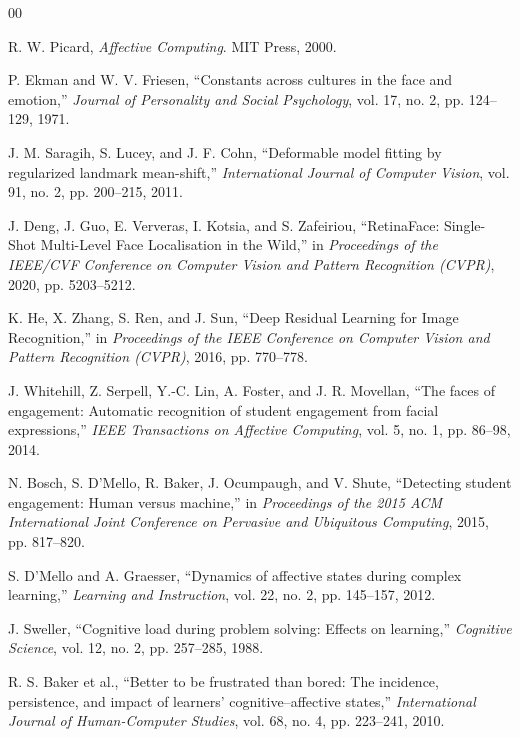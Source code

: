 \documentclass[conference]{IEEEtran}
\begin{document}
\begin{thebibliography}{00}

 R. W. Picard, \textit{Affective Computing}. MIT Press, 2000.

 P. Ekman and W. V. Friesen, ``Constants across cultures in the face and emotion,'' \textit{Journal of Personality and Social Psychology}, vol. 17, no. 2, pp. 124--129, 1971.

 J. M. Saragih, S. Lucey, and J. F. Cohn, ``Deformable model fitting by regularized landmark mean-shift,'' \textit{International Journal of Computer Vision}, vol. 91, no. 2, pp. 200--215, 2011.

 J. Deng, J. Guo, E. Ververas, I. Kotsia, and S. Zafeiriou, ``RetinaFace: Single-Shot Multi-Level Face Localisation in the Wild,'' in \textit{Proceedings of the IEEE/CVF Conference on Computer Vision and Pattern Recognition (CVPR)}, 2020, pp. 5203--5212.

 K. He, X. Zhang, S. Ren, and J. Sun, ``Deep Residual Learning for Image Recognition,'' in \textit{Proceedings of the IEEE Conference on Computer Vision and Pattern Recognition (CVPR)}, 2016, pp. 770--778.

 J. Whitehill, Z. Serpell, Y.-C. Lin, A. Foster, and J. R. Movellan, ``The faces of engagement: Automatic recognition of student engagement from facial expressions,'' \textit{IEEE Transactions on Affective Computing}, vol. 5, no. 1, pp. 86--98, 2014.

 N. Bosch, S. D'Mello, R. Baker, J. Ocumpaugh, and V. Shute, ``Detecting student engagement: Human versus machine,'' in \textit{Proceedings of the 2015 ACM International Joint Conference on Pervasive and Ubiquitous Computing}, 2015, pp. 817--820.

 S. D'Mello and A. Graesser, ``Dynamics of affective states during complex learning,'' \textit{Learning and Instruction}, vol. 22, no. 2, pp. 145--157, 2012.

 J. Sweller, ``Cognitive load during problem solving: Effects on learning,'' \textit{Cognitive Science}, vol. 12, no. 2, pp. 257--285, 1988.

 R. S. Baker et al., ``Better to be frustrated than bored: The incidence, persistence, and impact of learners’ cognitive–affective states,'' \textit{International Journal of Human-Computer Studies}, vol. 68, no. 4, pp. 223--241, 2010.


\end{thebibliography}
\end{document}
